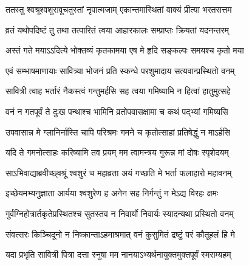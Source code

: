\twolineshloka
{ततस्तु श्वश्रूश्वशुरावूचतुस्तां नृपात्मजाम्}
{एकान्तमास्थितां वाक्यं प्रीत्या भरतसत्तम}


\twolineshloka
{व्रतं यथोपदिष्टं तु तथा तत्पारितं त्वया}
{आहारकालः सम्प्राप्तः क्रियतां यदनन्तरम्}




\twolineshloka
{अस्तं गते मयाऽऽदित्ये भोक्तव्यं कृतकामया}
{एष मे हृदि सङ्कल्पः समयश्च कृतो मया}




\twolineshloka
{एवं सम्भाषमाणायाः सावित्र्या भोजनं प्रति}
{स्कन्धे परशुमादाय सत्यवान्प्रस्थितो वनम्}


\twolineshloka
{सावित्री त्वाह भर्तारं नैकस्त्वं गन्तुमर्हसि}
{सह त्वया गमिष्यामि न हित्वां हातुमुत्सहे}




\twolineshloka
{वनं न गतपूर्वं ते दुःख पन्थाश्च भामिनि}
{व्रतोपवासक्षामा च कथं पद्भ्यां गमिष्यसि}




\twolineshloka
{उपवासान्न मे ग्लानिर्नास्ति चापि परिश्रमः}
{गमने च कृतोत्साहां प्रतिषेद्धुं न माऽर्हसि}




\twolineshloka
{यदि ते गमनोत्साहः करिष्यामि तव प्रयम्}
{मम त्वामन्त्रय गुरून्न मां दोषः स्पृशेदयम्}




\twolineshloka
{साऽभिवाद्याब्रवीच्छ्वश्रूं श्वशुरं च महाव्रता}
{अयं गच्छति मे भर्ता फलाहारो महावनम्}


\twolineshloka
{इच्छेयमभ्यनुज्ञाता आर्यया श्वशुरेण ह}
{अनेन सह निर्गन्तुं न मेऽद्य विरहः क्षमः}


\twolineshloka
{गुर्वग्निहोत्रार्तकृतेप्रस्थितश्च सुतस्तव}
{न निवार्यो निवार्यः स्यादन्यथा प्रस्थितो वनम्}


\twolineshloka
{संवत्सरः किञ्चिदूनो न निष्क्रान्ताऽहमाश्रमात्}
{वनं कुसुमितं द्रष्टुं परं कौतूहलं हि मे}




\twolineshloka
{यदा प्रभृति सावित्री पित्रा दत्ता स्नुषा मम}
{नानयाऽभ्यर्थनायुक्तमुक्तपूर्वं स्मराम्यहम्}


